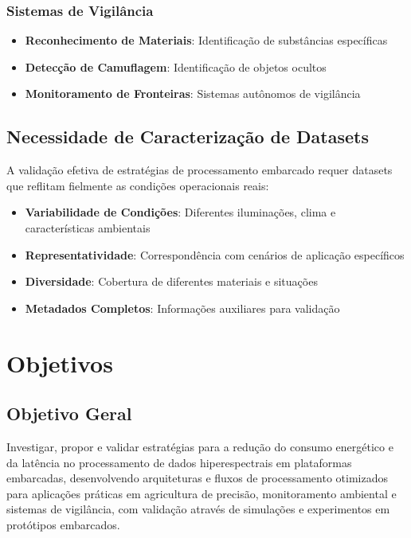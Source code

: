 \subsubsection{Sistemas de Vigilância}
\begin{itemize}
    \item \textbf{Reconhecimento de Materiais}: Identificação de substâncias específicas
    \item \textbf{Detecção de Camuflagem}: Identificação de objetos ocultos
    \item \textbf{Monitoramento de Fronteiras}: Sistemas autônomos de vigilância
\end{itemize}

\subsection{Necessidade de Caracterização de Datasets}
A validação efetiva de estratégias de processamento embarcado requer datasets que reflitam fielmente as condições operacionais reais:

\begin{itemize}
    \item \textbf{Variabilidade de Condições}: Diferentes iluminações, clima e características ambientais
    \item \textbf{Representatividade}: Correspondência com cenários de aplicação específicos
    \item \textbf{Diversidade}: Cobertura de diferentes materiais e situações
    \item \textbf{Metadados Completos}: Informações auxiliares para validação
\end{itemize}

\section{Objetivos}\label{sec:objetivos}

\subsection{Objetivo Geral}
Investigar, propor e validar estratégias para a redução do consumo energético e da latência no processamento de dados hiperespectrais em plataformas embarcadas, desenvolvendo arquiteturas e fluxos de processamento otimizados para aplicações práticas em agricultura de precisão, monitoramento ambiental e sistemas de vigilância, com validação através de simulações e experimentos em protótipos embarcados.

